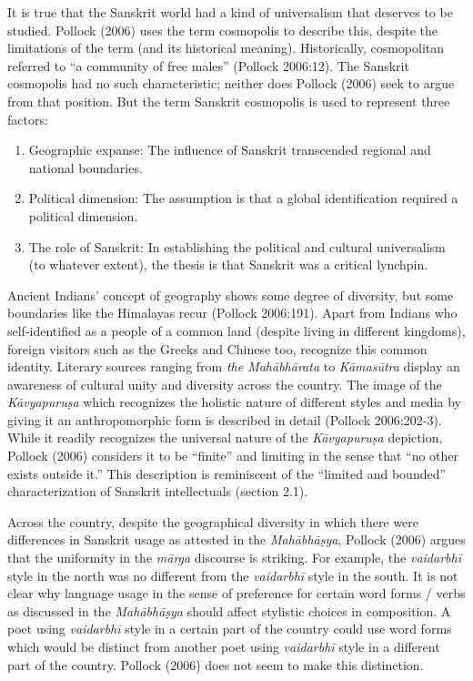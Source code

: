 It is true that the Sanskrit world had a kind of universalism that deserves to be studied. Pollock (2006) uses the term cosmopolis to describe this, despite the limitations of the term (and its historical meaning). Historically, cosmopolitan referred to “a community of free males” (Pollock 2006:12). The Sanskrit cosmopolis had no such characteristic; neither does Pollock (2006) seek to argue from that position. But the term Sanskrit cosmopolis is used to represent three factors: 
\begin{enumerate}
\itemsep=0pt
\item Geographic expanse: The influence of Sanskrit transcended regional and national boundaries.
\item Political dimension: The assumption is that a global identification required a political dimension. 
\item The role of Sanskrit: In establishing the political and cultural universalism (to whatever extent), the thesis is that Sanskrit was a critical lynchpin.
\end{enumerate}
Ancient Indians’ concept of geography shows some degree of diversity, but some boundaries like the Himalayas recur (Pollock 2006:191). Apart from Indians who self-identified as a people of a common land (despite living in different kingdoms), foreign visitors such as the Greeks and Chinese too, recognize this common identity. Literary sources ranging from {\sl the Mahābhārata} to {\sl Kāmasūtra} display an awareness of cultural unity and diversity across the country. The image of the {\sl Kāvyapuruṣa} which recognizes the holistic nature of different styles and media by giving it an anthropomorphic form is described in detail (Pollock 2006:202-3). While it readily recognizes the universal nature of the {\sl Kāvyapuruṣa} depiction, Pollock (2006) considers it to be “finite” and limiting in the sense that “no other exists outside it.” This description is reminiscent of the “limited and bounded” characterization of Sanskrit intellectuals (section 2.1).

Across the country, despite the geographical diversity in which there were differences in Sanskrit usage as attested in the {\sl Mahābhāṣya}, Pollock (2006) argues that the uniformity in the {\sl mārga} discourse is striking. For example, the {\sl vaidarbhī} style in the north was no different from the {\sl vaidarbhī} style in the south. It is not clear why language usage in the sense of preference for certain word forms / verbs as discussed in the {\sl Mahābhāṣya} should affect stylistic choices in composition. A poet using {\sl vaidarbhī} style in a certain part of the country could use word forms which would be distinct from another poet using {\sl vaidarbhī} style in a different part of the country. Pollock (2006) does not seem to make this distinction.

